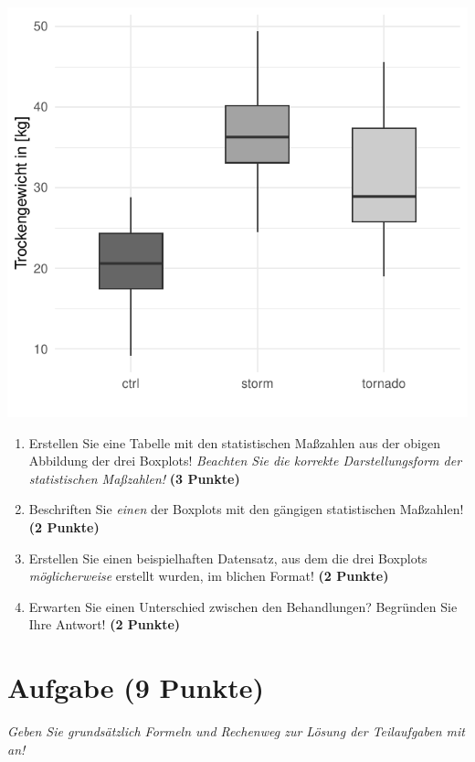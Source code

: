 \documentclass[a4paper, 9pt]{scrartcl}\usepackage[]{graphicx}\usepackage[]{xcolor}
\makeatletter
\def\maxwidth{ %
  \ifdim\Gin@nat@width>\linewidth
    \linewidth
  \else
    \Gin@nat@width
  \fi
}
\makeatother
\begin{document}
{\centering \includegraphics[width=\maxwidth]{img/boxplot-02-zer-1} 

}




\begin{enumerate}
\item Erstellen Sie eine Tabelle mit den statistischen Ma{\ss}zahlen aus der
  obigen Abbildung der drei Boxplots! \textit{Beachten Sie die korrekte
    Darstellungsform der statistischen Ma{\ss}zahlen!} \textbf{(3 Punkte)}
\item Beschriften Sie \textit{einen} der Boxplots mit den g{\"a}ngigen
  statistischen Ma{\ss}zahlen! \textbf{(2 Punkte)}
\item Erstellen Sie einen beispielhaften Datensatz, aus dem die drei
  Boxplots \textit{m{\"o}glicherweise} erstellt wurden, im blichen Format! \textbf{(2 Punkte)}
\item Erwarten Sie einen Unterschied zwischen den Behandlungen? Begr{\"u}nden
  Sie Ihre Antwort! \textbf{(2 Punkte)}
\end{enumerate} 
\clearpage

\section{Aufgabe \hfill (9 Punkte)}

\textit{Geben Sie grunds{\"a}tzlich Formeln und Rechenweg zur L{\"o}sung der
  Teilaufgaben mit an!} \\[1Ex]
\end{document}
